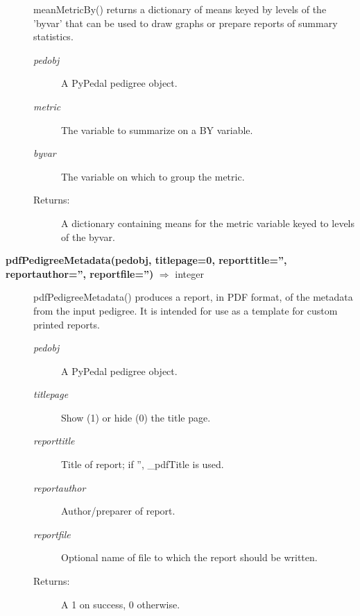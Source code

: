 \begin{description}
meanMetricBy() returns a dictionary of means keyed by levels of the 'byvar' that can be used to draw graphs or prepare reports of summary statistics.
\label{sec:pyp-reports-mean-metric-by}
\begin{description}
\item[\emph{pedobj}] A PyPedal pedigree object.
\item[\emph{metric}] The variable to summarize on a BY variable.
\item[\emph{byvar}] The variable on which to group the metric.
\item[Returns:] A dictionary containing means for the metric variable keyed to levels of the byvar.
\end{description}
\item[\textbf{pdfPedigreeMetadata(pedobj, titlepage=0, reporttitle='', reportauthor='', reportfile='')} $\Rightarrow$ integer ]
pdfPedigreeMetadata() produces a report, in PDF format, of the metadata from the input pedigree. It is intended for use as a template for custom printed reports.
\label{sec:pyp-reports-pdf-pedigree-metadata}
\begin{description}
\item[\emph{pedobj}] A PyPedal pedigree object.
\item[\emph{titlepage}] Show (1) or hide (0) the title page.
\item[\emph{reporttitle}] Title of report; if '', \_pdfTitle is used.
\item[\emph{reportauthor}] Author/preparer of report.
\item[\emph{reportfile}] Optional name of file to which the report should be written.
\item[Returns:] A 1 on success, 0 otherwise.
\end{description}
\end{description}